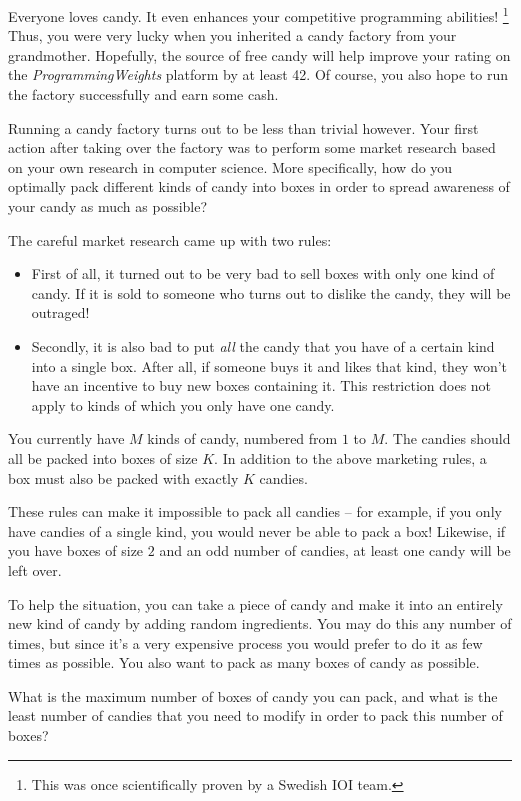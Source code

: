 Everyone loves candy.
It even enhances your competitive programming abilities!
\footnote{This was once scientifically proven by a Swedish IOI team.}
Thus, you were very lucky when you inherited a candy factory from your grandmother.
Hopefully, the source of free candy will help improve your rating on the \emph{ProgrammingWeights} platform by at least 42.
Of course, you also hope to run the factory successfully and earn some cash.

Running a candy factory turns out to be less than trivial however.
Your first action after taking over the factory was to perform some market research based on your own research in computer science.
More specifically, how do you optimally pack different kinds of candy into boxes in order to spread awareness of your candy as much as possible?

The careful market research came up with two rules:
\begin{itemize}
  \item First of all, it turned out to be very bad to sell boxes with only one kind of candy.
    If it is sold to someone who turns out to dislike the candy, they will be outraged!
  \item Secondly, it is also bad to put \emph{all} the candy that you have of a certain kind into a single box.
    After all, if someone buys it and likes that kind, they won't have an incentive to buy new boxes containing it.
    This restriction does not apply to kinds of which you only have one candy.
\end{itemize}

You currently have $M$ kinds of candy, numbered from $1$ to $M$.
The candies should all be packed into boxes of size $K$.
In addition to the above marketing rules, a box must also be packed with exactly $K$ candies.

These rules can make it impossible to pack all candies -- for example, if you only have candies of a single kind, you would never be able to pack a box!
Likewise, if you have boxes of size $2$ and an odd number of candies, at least one candy will be left over.

To help the situation, you can take a piece of candy and make it into an entirely new kind of candy by adding random ingredients.
You may do this any number of times, but since it's a very expensive process you would prefer to do it as few times as possible.
You also want to pack as many boxes of candy as possible.

What is the maximum number of boxes of candy you can pack, and what is the least number of candies that you need to modify in order to pack this number of boxes?

